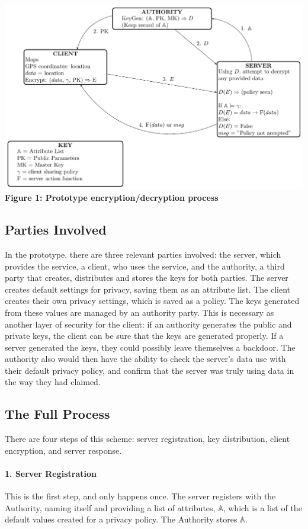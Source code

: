 \documentclass[12pt]{article}
\begin{document}
\begin{center}
\includegraphics[scale=.7]{policydiagram.pdf} \\
\textbf{Figure 1: Prototype encryption/decryption process}
\end{center}

\subsection{Parties Involved}
In the prototype, there are three relevant parties involved: the server, which provides the service, a client, who uses the service, and the authority, a third party that creates, distributes and stores the keys for both parties. The server creates default settings for privacy, saving them as an attribute list. The client creates their own privacy settings, which is saved as a policy. The keys generated from these values are managed by an authority party. This is necessary as another layer of security for the client: if an authority generates the public and private keys, the client can be sure that the keys are generated properly. If a server generated the keys, they could possibly leave themselves a backdoor. The authority also would then have the ability to check the server's data use with their default privacy policy, and confirm that the server was truly using data in the way they had claimed. 

\subsection{The Full Process}
There are four steps of this scheme: server registration, key distribution, client encryption, and server response.

\paragraph{1. Server Registration}
This is the first step, and only happens once. The server registers with the Authority, naming itself and providing a list of attributes, $\mathbb{A}$, which is a list of the default values created for a privacy policy. The Authority stores $\mathbb{A}$.
\end{document}
